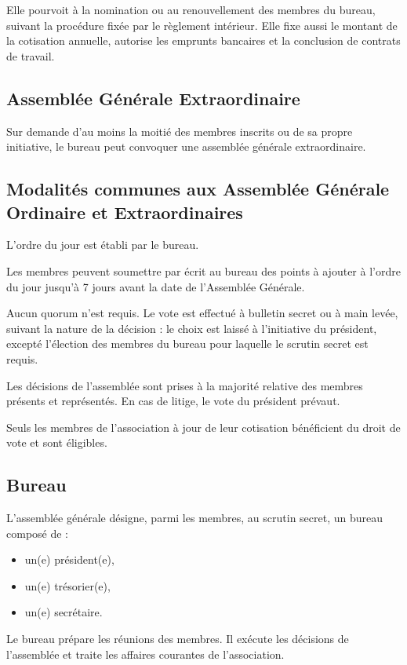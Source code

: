 \documentclass[a4paper,french,10pt]{article}
\newcommand{\article}[1]{\subsection{#1}\addtocounter{article}{1}}
\newcounter{article}
\begin{document}
Elle pourvoit à la nomination ou au renouvellement des membres du
bureau, suivant la procédure fixée par le règlement intérieur. Elle
fixe aussi le montant de la cotisation annuelle, autorise les emprunts
bancaires et la conclusion de contrats de travail.


\article{Assemblée Générale Extraordinaire}
\label{sec:age}

Sur demande d'au moins la moitié des membres inscrits ou de sa propre
initiative, le bureau %
peut convoquer une assemblée générale extraordinaire.

\article{Modalités communes aux Assemblée Générale Ordinaire et Extraordinaires}
\label{sec:ag}
L'ordre du jour est établi par le bureau. %

Les membres peuvent soumettre par écrit au bureau des points à ajouter à l'ordre du jour jusqu'à 7 jours avant la date de l'Assemblée Générale.


Aucun quorum n'est requis. Le vote est effectué à bulletin secret ou à
main levée, suivant la nature de la décision : le choix est laissé à
l'initiative du président, excepté l'élection des membres du bureau
pour laquelle le scrutin secret est requis.

Les décisions de l’assemblée sont prises à la majorité relative des
membres présents et représentés. En cas de litige, le vote du
président prévaut.

Seuls les membres de l’association à jour de leur cotisation
bénéficient du droit de vote et sont éligibles.





\article{Bureau}
\label{sec:bureau}
L’assemblée générale désigne, parmi les membres, au scrutin secret, un
bureau composé de :
\begin{itemize}
\item un(e) président(e),
  
\item un(e) trésorier(e),

\item un(e) secrétaire.
\end{itemize}

Le bureau prépare les réunions des membres. Il exécute les décisions de l’assemblée et traite les affaires courantes de l’association.
\end{document}
